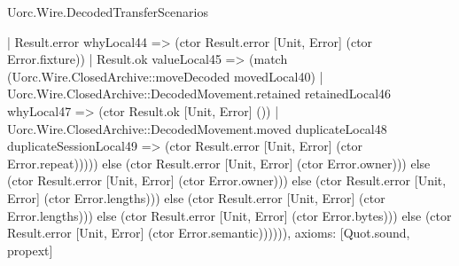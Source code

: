 \begin{lexlean}{Uorc.Wire.DecodedTransferScenarios}
\begin{semanticmodule}
{            | Result.error whyLocal44 => (ctor Result.error [Unit, Error] (ctor Error.fixture))
            | Result.ok valueLocal45 => (match (Uorc.Wire.ClosedArchive::moveDecoded movedLocal40)
              | Uorc.Wire.ClosedArchive::DecodedMovement.retained retainedLocal46 whyLocal47 => (ctor Result.ok [Unit, Error] ())
              | Uorc.Wire.ClosedArchive::DecodedMovement.moved duplicateLocal48 duplicateSessionLocal49 => (ctor Result.error [Unit, Error] (ctor Error.repeat))))) else (ctor Result.error [Unit, Error] (ctor Error.owner))) else (ctor Result.error [Unit, Error] (ctor Error.owner))) else (ctor Result.error [Unit, Error] (ctor Error.lengths))) else (ctor Result.error [Unit, Error] (ctor Error.lengths))) else (ctor Result.error [Unit, Error] (ctor Error.bytes))) else (ctor Result.error [Unit, Error] (ctor Error.semantic)))))),
  axioms: [Quot.sound, propext]
}


\end{semanticmodule}
\end{lexlean}
